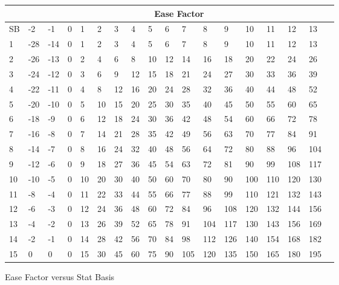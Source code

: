 
\begin{figure}[h]
\begin{tabular}{llllllllllllllllll} \hline
	& \multicolumn{17}{c}{Ease Factor} \\ \hline \hline
SB  &-2   &-1    &0    &1    &2    &3    &4    &5    &6    &7    &8    &9   &10   &11   &12   &13 \\ \cline{2-18}
 1  &-28  &-14    &0    &1    &2    &3    &4    &5    &6    &7    &8    &9   &10   &11   &12   &13 \\
 2  &-26  &-13    &0    &2    &4    &6    &8   &10   &12   &14   &16   &18   &20   &22   &24   &26 \\
 3  &-24  &-12    &0    &3    &6    &9   &12   &15   &18   &21   &24   &27   &30   &33   &36   &39 \\
 4  &-22  &-11    &0    &4    &8   &12   &16   &20   &24   &28   &32   &36   &40   &44   &48   &52 \\
 5  &-20  &-10    &0    &5   &10   &15   &20   &25   &30   &35   &40   &45   &50   &55   &60   &65 \\
 6  &-18   &-9    &0    &6   &12   &18   &24   &30   &36   &42   &48   &54   &60   &66   &72   &78 \\
 7  &-16   &-8    &0    &7   &14   &21   &28   &35   &42   &49   &56   &63   &70   &77   &84   &91 \\
 8  &-14   &-7    &0    &8   &16   &24   &32   &40   &48   &56   &64   &72   &80   &88   &96  &104 \\
 9  &-12   &-6    &0    &9   &18   &27   &36   &45   &54   &63   &72   &81   &90   &99  &108  &117 \\
10  &-10   &-5    &0   &10   &20   &30   &40   &50   &60   &70   &80   &90  &100  &110  &120  &130 \\
11  &-8   &-4    &0   &11   &22   &33   &44   &55   &66   &77   &88   &99  &110  &121  &132  &143 \\
12  &-6   &-3    &0   &12   &24   &36   &48   &60   &72   &84   &96  &108  &120  &132  &144  &156 \\
13  &-4   &-2    &0   &13   &26   &39   &52   &65   &78   &91  &104  &117  &130  &143  &156  &169 \\
14  &-2   &-1    &0   &14   &28   &42   &56   &70   &84   &98  &112  &126  &140  &154  &168  &182 \\
15  &0    &0    &0   &15   &30   &45   &60   &75   &90  &105  &120  &135  &150  &165  &180  &195 \\ \hline
\end{tabular}
\caption{Ease Factor versus Stat Basis}
\end{figure}     

     
     
     
     
     
     
     
     
     
     
     
     
     
     
     
